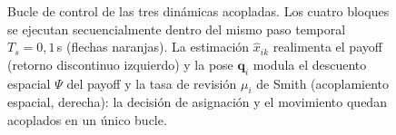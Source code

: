 \begin{figure}[htbp]
\caption[Bucle de control de las tres dinámicas acopladas]%
{Bucle de control de las tres dinámicas acopladas. Los cuatro bloques se ejecutan
secuencialmente dentro del mismo paso temporal $T_s = 0{,}1$\,s (flechas naranjas). La
estimación $\hat{x}_{ik}$ realimenta el payoff (retorno discontinuo izquierdo) y la
pose $\mathbf{q}_i$ modula el descuento espacial $\Psi$ del payoff y la tasa de
revisión $\mu_i$ de Smith (acoplamiento espacial, derecha): la decisión de asignación
y el movimiento quedan acoplados en un único bucle.}
\label{fig:loop}
\end{figure}
